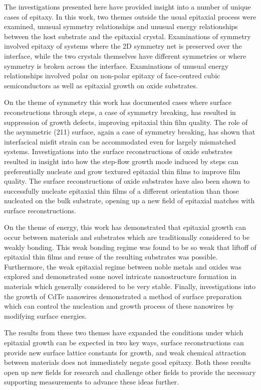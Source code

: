 The investigations presented here have provided insight into a number of unique cases of epitaxy.
In this work, two themes outside the usual epitaxial process were examined, unusual symmetry relationships and unusual energy relationships between the host substrate and the epitaxial crystal.
Examinations of symmetry involved epitaxy of systems where the 2D symmetry net is preserved over the interface, while the two crystals themselves have different symmetries or where symmetry is broken across the interface.
Examinations of unusual energy relationships involved polar on non-polar epitaxy of face-centred cubic semiconductors as well as epitaxial growth on oxide substrates.

On the theme of symmetry this work has documented cases where surface reconstructions through steps, a case of symmetry breaking, has resulted in suppression of growth defects, improving epitaxial thin film quality.
The role of the asymmetric (211) surface, again a case of symmetry breaking, has shown that interfacical misfit strain can be accommodated even for largely mismatched systems.
Investigations into the surface reconstructions of oxide substrates resulted in insight into how the step-flow growth mode induced by steps can preferentially nucleate and grow textured epitaxial thin films to improve film quality.
The surface reconstructions of oxide substrates have also been shown to successfully nucleate epitaxial thin films of a different orientation than those nucleated on the bulk substrate, opening up a new field of epitaxial matches with surface reconstructions.

On the theme of energy, this work has demonstrated that epitaxial growth can occur between materials and substrates which are traditionally considered to be weakly bonding. This weak bonding regime was found to be so weak that liftoff of epitaxial thin films and reuse of the resulting substrates was possible. Furthermore, the weak epitaxial regime between noble metals and oxides was explored and demonstrated some novel intricate nanostructure formation in materials which generally considered to be very stable. Finally, investigations into the growth of CdTe nanowires demonstrated a method of surface preparation which can control the nucleation and growth process of these nanowires by modifying surface energies.

The results from these two themes have expanded the conditions under which epitaxial growth can be expected in two key ways, surface reconstructions can provide new surface lattice constants for growth, and weak chemical attraction between materials does not immediately negate good epitaxy. Both these results open up new fields for research and challenge other fields to provide the necessary supporting measurements to advance these ideas further.